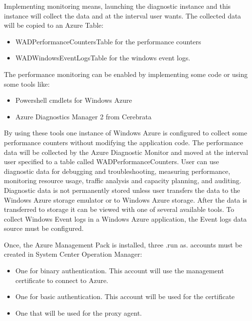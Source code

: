 \documentclass{sig-alternate}
\begin{document}
Implementing monitoring means, launching the diagnostic instance and this instance will collect the data and at the interval user wants. The collected data will be copied to an Azure Table:

\begin{itemize}
\item WADPerformanceCountersTable for the performance counters
\item WADWindowsEventLogsTable for the windows event logs.
\end{itemize}

The performance monitoring can be enabled by implementing some code or using some tools like:

\begin{itemize}
  \item Powershell cmdlets for Windows Azure~\cite{cmdlets}
  \item Azure Diagnostics Manager 2 from Cerebrata~\cite{cerebrata}
\end{itemize}

By using these tools one instance of Windows Azure is configured to collect some performance counters without modifying the application code. The performance data will be collected by the Azure Diagnostic Monitor and moved at the interval user specified to a table called WADPerformanceCounters. User can use diagnostic data for debugging and troubleshooting, measuring performance, monitoring resource usage, traffic analysis and capacity planning, and auditing. Diagnostic data is not permanently stored unless user transfers the data to the Windows Azure storage emulator or to Windows Azure storage. After the data is transferred to storage it can be viewed with one of several available tools. To collect Windows Event logs in a Windows Azure application, the Event logs data source must be configured.

Once, the Azure Management Pack is installed, three .run as. accounts must be created in System Center Operation Manager:

\begin{itemize}
 \item One for binary authentication. This account will use the management certificate to connect to Azure.
 \item One for basic authentication. This account will be used for the certificate
 \item One that will be used for the proxy agent.
\end{itemize}
 
\end{document}
